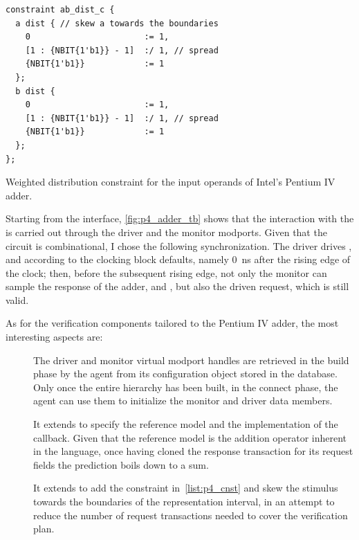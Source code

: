 \begin{listing}
\begin{verbatim}
constraint ab_dist_c {
  a dist { // skew a towards the boundaries
    0                       := 1,
    [1 : {NBIT{1'b1}} - 1]  :/ 1, // spread
    {NBIT{1'b1}}            := 1
  };
  b dist {
    0                       := 1,
    [1 : {NBIT{1'b1}} - 1]  :/ 1, // spread
    {NBIT{1'b1}}            := 1
  };
};
\end{verbatim}
\caption{Weighted distribution constraint for the input operands of Intel's Pentium IV adder.}
\label{list:p4_cnst}
\end{listing}

\noindent Starting from the interface, \cref{fig:p4_adder_tb} shows that the interaction with the \dut is carried out through the driver and the monitor modports. Given that the circuit is combinational, I chose the following synchronization. The driver drives ,  and  according to the clocking block defaults, namely \qty{0}{\nano\second} after the rising edge of the clock; then,  before the subsequent rising edge, not only the monitor can sample the response of the adder,  and , but also the driven request, which is still valid.

As for the verification components tailored to the Pentium IV adder, the most interesting aspects are:
\begin{description}
    \item[] The driver and monitor virtual modport handles are retrieved in the build phase by the agent from its configuration object stored in the database. Only once the entire hierarchy has been built, in the connect phase, the agent can use them to initialize the monitor and driver data members. 

    \item[] It extends  to specify the reference model and the implementation of the  callback. Given that the reference model is the addition operator inherent in the language, once having cloned the response transaction for its request fields the prediction boils down to a sum.

    \item[] It extends  to add the constraint in~\cref{list:p4_cnst} and skew the stimulus towards the boundaries of the representation interval, in an attempt to reduce the number of request transactions needed to cover the verification plan.
\end{description}

